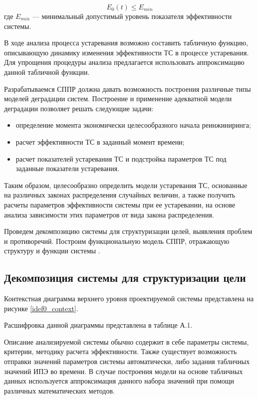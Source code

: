 \begin{equation} \label{eq:oldModel}
    E_0(t) \leq E_{min}
\end{equation}
\vspace{\baselineskip}
где	$E_{min}$ --- минимальный допустимый уровень показателя эффективности системы.

В ходе анализа процесса устаревания возможно составить табличную функцию, описывающую динамику изменения эффективности ТС в процессе устаревания. 
Для упрощения процедуры анализа предлагается использовать аппроксимацию данной табличной функции.
 
Разрабатываемся СППР должна давать возможность построения различные типы моделей деградации систем. 
Построение и применение адекватной модели деградации позволяет решать следующие задачи:
\begin{itemize}
  \item определение момента экономически целесообразного начала реинжиниринга;
  \item расчет эффективности ТС в заданный момент времени;
  \item расчет показателей устаревания ТС и подстройка параметров ТС под заданные показатели устаревания.
\end{itemize}

Таким образом, целесообразно определить модели устаревания ТС, основанные на различных законах распределения случайных величин, а также получить расчеты параметров эффективности системы при ее устаревании, на основе анализа зависимости этих параметров от вида закона распределения.

Проведем декомпозицию системы для структуризации целей, выявления проблем и противоречий. 
Построим функциональную модель СППР, отражающую структуру и функции системы \cite{Doronina, Litvak}. 

\subsection{Декомпозиция системы для структуризации цели}

Контекстная диаграмма верхнего уровня проектируемой системы представлена на рисунке \ref{idef0_context}.


Расшифровка данной диаграммы представлена в таблице А.1.

Описание анализируемой системы обычно содержит в себе параметры системы, критерии, методику расчета эффективности. 
Также существует возможность отправки значений параметров системы автоматически, либо задания табличных значений ИПЭ во времени. 
В случае построения модели на основе табличных данных используется аппроксимация данного набора значений при помощи различных математических методов.

